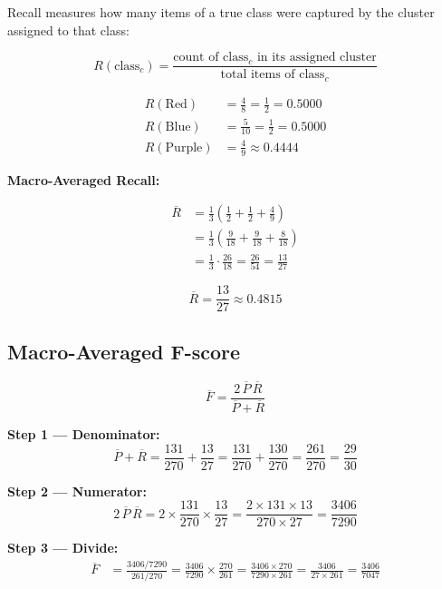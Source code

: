 \documentclass[11pt, a4paper]{article}
\begin{document}
Recall measures how many items of a true class were captured by the cluster
assigned to that class:

\[
  R(\text{class}_c)
  = \frac{\text{count of class}_c \text{ in its assigned cluster}}
         {\text{total items of class}_c}
\]

\begin{align*}
  R(\text{Red})    &= \frac{4}{8}  = \frac{1}{2} = 0.5000 \\[4pt]
  R(\text{Blue})   &= \frac{5}{10} = \frac{1}{2} = 0.5000 \\[4pt]
  R(\text{Purple}) &= \frac{4}{9}  \approx 0.4444
\end{align*}

\textbf{Macro-Averaged Recall:}

\begin{align*}
  \overline{R}
  &= \frac{1}{3}\!\left(\frac{1}{2} + \frac{1}{2} + \frac{4}{9}\right) \\[6pt]
  &= \frac{1}{3}\!\left(\frac{9}{18} + \frac{9}{18} + \frac{8}{18}\right) \\[6pt]
  &= \frac{1}{3} \cdot \frac{26}{18}
   = \frac{26}{54}
   = \frac{13}{27}
\end{align*}

\begin{mathbox}
\[
  \overline{R} = \frac{13}{27} \approx 0.4815
\]
\end{mathbox}

\subsection{Macro-Averaged F-score}

\[
  \overline{F} = \frac{2\,\overline{P}\,\overline{R}}{\overline{P} + \overline{R}}
\]

\textbf{Step 1 --- Denominator:}
\[
  \overline{P} + \overline{R}
  = \frac{131}{270} + \frac{13}{27}
  = \frac{131}{270} + \frac{130}{270}
  = \frac{261}{270}
  = \frac{29}{30}
\]

\textbf{Step 2 --- Numerator:}
\[
  2\,\overline{P}\,\overline{R}
  = 2 \times \frac{131}{270} \times \frac{13}{27}
  = \frac{2 \times 131 \times 13}{270 \times 27}
  = \frac{3406}{7290}
\]

\textbf{Step 3 --- Divide:}
\begin{align*}
  \overline{F}
  &= \frac{3406/7290}{261/270}
   = \frac{3406}{7290} \times \frac{270}{261}
   = \frac{3406 \times 270}{7290 \times 261}
   = \frac{3406}{27 \times 261}
   = \frac{3406}{7047}
\end{align*}
\end{document}
